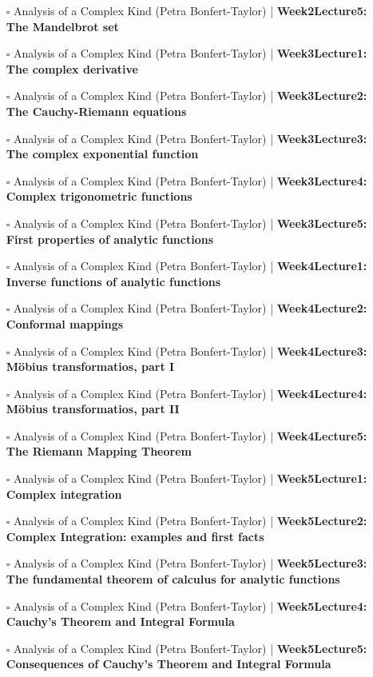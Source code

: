 \documentclass[a4, landscape, 12pt]{article}
\newcommand{\checkbox}{$\square$}%
\begin{document}
\begin{itemize}
{}
\item [\checkbox] Analysis of a Complex Kind (Petra Bonfert-Taylor)  | \textbf{Week2Lecture5: The Mandelbrot set
}
\item [\checkbox] Analysis of a Complex Kind (Petra Bonfert-Taylor)  | \textbf{Week3Lecture1: The complex derivative
}
\item [\checkbox] Analysis of a Complex Kind (Petra Bonfert-Taylor)  | \textbf{Week3Lecture2: The Cauchy-Riemann equations
}
\item [\checkbox] Analysis of a Complex Kind (Petra Bonfert-Taylor)  | \textbf{Week3Lecture3: The complex exponential function
}
\item [\checkbox] Analysis of a Complex Kind (Petra Bonfert-Taylor)  | \textbf{Week3Lecture4: Complex trigonometric functions
}
\item [\checkbox] Analysis of a Complex Kind (Petra Bonfert-Taylor)  | \textbf{Week3Lecture5: First properties of analytic functions
}
\item [\checkbox] Analysis of a Complex Kind (Petra Bonfert-Taylor)  | \textbf{Week4Lecture1: Inverse functions of analytic functions
}
\item [\checkbox] Analysis of a Complex Kind (Petra Bonfert-Taylor)  | \textbf{Week4Lecture2: Conformal mappings
}
\item [\checkbox] Analysis of a Complex Kind (Petra Bonfert-Taylor)  | \textbf{Week4Lecture3: Möbius transformatios, part I
}
\item [\checkbox] Analysis of a Complex Kind (Petra Bonfert-Taylor)  | \textbf{Week4Lecture4: Möbius transformatios, part II
}
\item [\checkbox] Analysis of a Complex Kind (Petra Bonfert-Taylor)  | \textbf{Week4Lecture5: The Riemann Mapping Theorem
}
\item [\checkbox] Analysis of a Complex Kind (Petra Bonfert-Taylor)  | \textbf{Week5Lecture1: Complex integration
}
\item [\checkbox] Analysis of a Complex Kind (Petra Bonfert-Taylor)  | \textbf{Week5Lecture2: Complex Integration: examples and first facts
}
\item [\checkbox] Analysis of a Complex Kind (Petra Bonfert-Taylor)  | \textbf{Week5Lecture3: The fundamental theorem of calculus for analytic functions
}
\item [\checkbox] Analysis of a Complex Kind (Petra Bonfert-Taylor)  | \textbf{Week5Lecture4: Cauchy's Theorem and Integral Formula
}
\item [\checkbox] Analysis of a Complex Kind (Petra Bonfert-Taylor)  | \textbf{Week5Lecture5: Consequences of Cauchy's Theorem and Integral Formula
}
\end{itemize}
\end{document}
